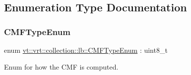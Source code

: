 \subsection{Enumeration Type Documentation}
\mbox{\label{namespacevt_1_1vrt_1_1collection_1_1lb_ada1e381e6b19ba9f8277d4f698445404}} 
\subsubsection{\texorpdfstring{C\+M\+F\+Type\+Enum}{CMFTypeEnum}}
{\footnotesize\ttfamily enum \hyperlink{namespacevt_1_1vrt_1_1collection_1_1lb_ada1e381e6b19ba9f8277d4f698445404}{vt\+::vrt\+::collection\+::lb\+::\+C\+M\+F\+Type\+Enum} \+: uint8\+\_\+t\hspace{0.3cm}{\ttfamily [strong]}}



Enum for how the C\+MF is computed. 

